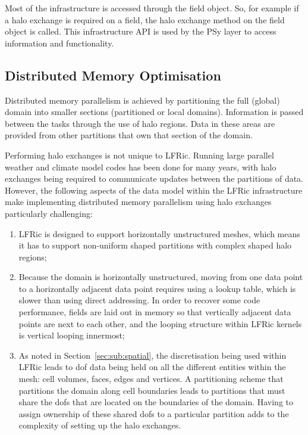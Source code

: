 \documentclass[review,times]{elsarticle}
\begin{document}
Most of the infrastructure is accessed through the field object. So, for
example if a halo exchange is required on a field, the halo exchange
method on the field object is called. This infrastructure
API is used by the PSy layer to access information and functionality.

\subsection{\label{sec:sub:distmem}Distributed Memory Optimisation}

Distributed memory parallelism is achieved by partitioning the full
(global) domain into smaller sections (partitioned or local domains).
Information is passed between the tasks through the use of halo regions.
Data in these areas are provided from other partitions that own that
section of the domain.

Performing halo exchanges is not unique to LFRic. Running large parallel
weather and climate model codes has been done for many years, with halo
exchanges being required to communicate updates between the partitions of 
data. However, the following aspects of the data model within the LFRic 
infrastructure make implementing distributed memory parallelism using 
halo exchanges particularly challenging:

\begin{enumerate}

\item LFRic is designed to support horizontally unstructured meshes,
which means it has to support non-uniform shaped partitions with complex
shaped halo regions;

\item Because the domain is horizontally unstructured, moving from one
data point to a horizontally adjacent data point requires using a lookup
table, which is slower than using direct addressing. In order to recover
some code performance, fields are laid out in memory so that vertically
adjacent data points are next to each other, and the looping structure
within LFRic kernels is vertical looping innermost;

\item As noted in Section~\ref{sec:sub:spatial}, the discretisation being used within
LFRic leads to dof data being held on all the different entities within the mesh: 
cell volumes, faces, edges and vertices. A partitioning scheme that partitions
the domain along cell boundaries leads to partitions that must share the
dofs that are located on the boundaries of the domain. Having to assign
ownership of these shared dofs to a particular partition adds to the
complexity of setting up the halo exchanges.

\end{enumerate}
\end{document}

